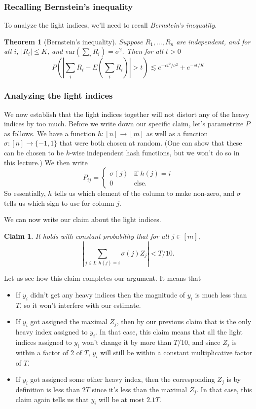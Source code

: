 \documentclass[11pt]{article}
\newtheorem{theorem}{Theorem}
\newtheorem{claim}{Claim}
\begin{document}
\subsubsection{Recalling Bernstein's inequality}
To analyze the light indices, we'll need to recall {\em Bernstein's inequality}.
\begin{theorem}[Bernstein's inequality]
Suppose $R_1, \ldots,R_n$ are independent, and for all $i$, $|R_i| \leq K$, and $\text{var}(\sum_i R_i) = \sigma^2$. Then for all $t > 0$
\[
P\left( \left| \sum_i R_i - E\left(\sum_i R_i \right) \right| > t \right) \lesssim  e^{-c t^2 / \sigma^2} + e^{- c t/K} 
\]
\end{theorem}

\subsubsection{Analyzing the light indices}
We now establish that the light indices together will not distort any of the heavy indices by too much. Before we write down our specific claim, let's parametrize $P$ as follows. We have a function $h : [n] \rightarrow [m]$ as well as a function $\sigma : [n] \rightarrow \{-1, 1\}$ that were both chosen at random. (One can show that these can be chosen to be $k$-wise independent hash functions, but we won't do so in this lecture.) We then write
\[
P_{ij} = \begin{cases}
\sigma(j) & \text{if } h(j) = i \\
0 & \text{else.}
\end{cases}
\]
So essentially, $h$ tells us which element of the column to make non-zero, and $\sigma$ tells us which sign to use for column $j$.

We can now write our claim about the light indices.
\begin{claim} \label{lightindices}
It holds with constant probability that for all $j \in [m]$,
\[
\left| \sum_{j \in L : h(j) = i} \sigma(j)Z_j \right| < T/10.
\]
\end{claim}
Let us see how this claim completes our argument. It means that
\begin{itemize}
\item If $y_i$ didn't get any heavy indices then the magnitude of $y_i$ is much less than $T$, so it won't interfere with our estimate.
\item If $y_i$ got assigned the maximal $Z_j$, then by our previous claim that is the only heavy index assigned to $y_i$. In that case, this claim means that all the light indices assigned to $y_i$ won't change it by more than $T/10$, and since $Z_j$ is within a factor of 2 of $T$, $y_i$ will still be within a constant multiplicative factor of $T$.
\item If $y_i$ got assigned some other heavy index, then the corresponding $Z_j$ is by definition is less than $2T$ since it's less than the maximal $Z_j$. In that case, this claim again tells us that $y_i$ will be at most $2.1T$.
\end{itemize}
\end{document}

